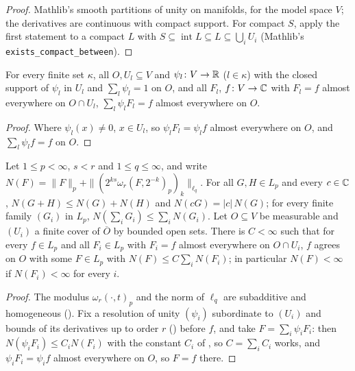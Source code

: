 \begin{proof}
\leanok
Mathlib's smooth partitions of unity on manifolds, for the model space $V$; the derivatives are
continuous with compact support. For compact $S$, apply the first statement to a compact $L$ with
$S \subseteq \operatorname{int} L \subseteq L \subseteq \bigcup_i U_i$ (Mathlib's
\texttt{exists\_\allowbreak compact\_\allowbreak between}).
\end{proof}

\begin{lemma}
\label{lem:pasting-agrees}
\leanok
For every finite set $\kappa$, all $O, U_l \subseteq V$ and $\psi_l \colon V \to \mathbb{R}$
($l \in \kappa$) with the closed support of $\psi_l$ in $U_l$ and $\sum_l \psi_l = 1$ on $O$, and
all $F_l$, $f \colon V \to \mathbb{C}$ with $F_l = f$ almost everywhere on $O \cap U_l$,
$\sum_l \psi_l F_l = f$ almost everywhere on $O$.
\end{lemma}

\begin{proof}
\leanok
Where $\psi_l(x) \neq 0$, $x \in U_l$, so $\psi_l F_l = \psi_l f$ almost everywhere on $O$, and
$\sum_l \psi_l f = f$ on $O$.
\end{proof}

\begin{lemma}
\label{lem:pasting}
\leanok
{}
Let $1 \leq p < \infty$, $s < r$ and $1 \leq q \leq \infty$, and write
$N(F) = \|F\|_p + \|(2^{ks} \omega_r(F, 2^{-k})_p)_k\|_{\ell_q}$. For all $G, H \in L_p$ and
every $c \in \mathbb{C}$, $N(G + H) \leq N(G) + N(H)$ and $N(c G) = |c| \, N(G)$; for every finite family
$(G_i)$ in $L_p$, $N(\sum_i G_i) \leq \sum_i N(G_i)$. Let $O \subseteq V$ be measurable and $(U_i)$
a finite cover of $\overline O$ by bounded open sets. There is $C < \infty$ such that for every
$f \in L_p$ and all $F_i \in L_p$ with $F_i = f$ almost everywhere on $O \cap U_i$, $f$ agrees on
$O$ with some $F \in L_p$ with $N(F) \leq C \sum_i N(F_i)$; in particular $N(F) < \infty$ if
$N(F_i) < \infty$ for every $i$.
\end{lemma}

\begin{proof}
\leanok
The modulus $\omega_r(\cdot, t)_p$ and the norm of $\ell_q$ are subadditive and homogeneous
(). Fix a resolution of
unity $(\psi_i)$ subordinate to $(U_i)$ and bounds of its derivatives up to order $r$
() before $f$, and take $F = \sum_i \psi_i F_i$: then
$N(\psi_i F_i) \leq C_i N(F_i)$ with the constant $C_i$ of , so
$C = \sum_i C_i$ works, and $\psi_i F_i = \psi_i f$ almost everywhere on $O$, so $F = f$ there.
\end{proof}

